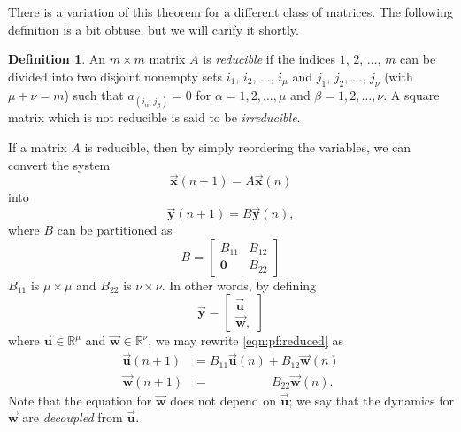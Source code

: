\documentclass[reqno]{immbook}
\newcommand{\Real}{\mathbb{R}}
\newcommand{\BU}{\vec{\textbf{u}}}
\newcommand{\BW}{\vec{\textbf{w}}}
\newcommand{\BX}{\vec{\textbf{x}}}
\newcommand{\BY}{\vec{\textbf{y}}}
\numberwithin{equation}{chapter}
\numberwithin{question}{section}
\numberwithin{theorem}{chapter}
\numberwithin{figure}{chapter}
\theoremstyle{definition}
\newtheorem{definition}{Definition}[section]
\begin{document}
\medskip

There is a variation of this theorem for a different
class of matrices.
The following definition is a bit obtuse, but we will
carify it shortly.
\begin{definition}
An $m\times m$ matrix $A$ is \emph{reducible}
if the indices $1$, $2$, $\ldots$, $m$
can be divided into two disjoint nonempty sets
$i_1$, $i_2$, $\ldots$, $i_{\mu}$ and
$j_1$, $j_2$, $\ldots$, $j_{\nu}$ (with $\mu+\nu = m$) such that
$a_{(i_{\alpha},j_{\beta})} =0$
for $\alpha=1, 2, \ldots, \mu$ and
$\beta = 1, 2, \ldots, \nu$.
A square matrix which is not reducible is said
to be \emph{irreducible}. 
\end{definition}
If a matrix $A$ is reducible, then by simply reordering the
variables, we can convert the system
\begin{equation}
   \BX(n+1)  = A\BX(n)
\label{eqn:pf:linmap}
\end{equation}
into
\begin{equation}
   \BY(n+1) = B\BY(n),
\label{eqn:pf:reduced}
\end{equation}
where $B$ can be partitioned as
\begin{equation}
   B = \begin{bmatrix}
            B_{11} & B_{12} \\
            \textbf{0} & B_{22}
       \end{bmatrix}
\end{equation}
$B_{11}$ is  $\mu\times\mu$ and $B_{22}$ is $\nu\times\nu$. 
In other words, by defining
\begin{equation}
   \BY = \begin{bmatrix} \BU \\ \BW,
         \end{bmatrix}
\end{equation}
where $\BU \in \Real^{\mu}$ and $\BW \in \Real^{\nu}$,
we may rewrite
\eqref{eqn:pf:reduced} as
\begin{equation}
\begin{split}
   \BU(n+1) & = B_{11}\BU(n) + B_{12} \BW(n) \\
   \BW(n+1) & = \quad\quad\quad\quad\quad B_{22} \BW(n).
\end{split}
\end{equation}
Note that the equation for $\BW$ does not depend
on $\BU$; we say that the dynamics for $\BW$
are \emph{decoupled} from $\BU$.
\end{document}

